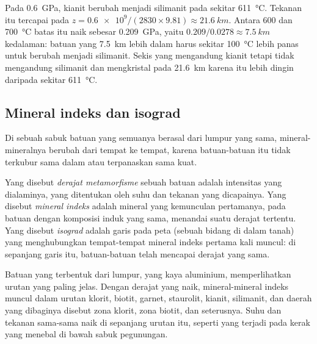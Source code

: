 \begin{example}\label{ex:g12:metamorphic-rocks:kysil}
Pada \qty{0.6}{GPa}, kianit berubah menjadi silimanit pada sekitar
\qty{611}{\celsius}. Tekanan itu tercapai pada $z = \num{0.6e9} / (2830
\times 9.81) \approx \qty{21.6}{km}$. Antara 600 dan \qty{700}{\celsius}
batas itu naik sebesar \qty{0.209}{GPa}, yaitu $0.209/0.0278 \approx
\qty{7.5}{km}$ kedalaman: batuan yang \qty{7.5}{km} lebih dalam harus sekitar
\qty{100}{\celsius} lebih panas untuk berubah menjadi silimanit. Sekis yang
mengandung kianit tetapi tidak mengandung silimanit dan mengkristal pada
\qty{21.6}{km} karena itu lebih dingin daripada sekitar \qty{611}{\celsius}.
\end{example}

\subsection{Mineral indeks dan isograd}

Di sebuah sabuk batuan yang semuanya berasal dari lumpur yang sama,
mineral-mineralnya berubah dari tempat ke tempat, karena batuan-batuan itu
tidak terkubur sama dalam atau terpanaskan sama kuat.

\begin{definition}\label{def:g12:metamorphic-rocks:index-mineral}
Yang disebut \emph{derajat metamorfisme} sebuah
batuan adalah intensitas  yang dialaminya, yang ditentukan oleh
suhu dan tekanan yang dicapainya. Yang disebut \emph{mineral
indeks} adalah mineral yang kemunculan pertamanya, pada
batuan dengan komposisi induk yang sama, menandai suatu derajat tertentu. Yang
disebut \emph{isograd} adalah garis pada peta (sebuah bidang di
dalam tanah) yang menghubungkan tempat-tempat mineral indeks pertama kali
muncul: di sepanjang garis itu, batuan-batuan telah mencapai derajat yang sama.
\end{definition}

Batuan yang terbentuk dari lumpur, yang kaya aluminium, memperlihatkan urutan
yang paling jelas. Dengan derajat yang naik, mineral-mineral indeks muncul
dalam urutan klorit, biotit, garnet, staurolit, kianit, silimanit, dan daerah
yang dibaginya disebut zona klorit, zona biotit, dan seterusnya. Suhu dan
tekanan sama-sama naik di sepanjang urutan itu, seperti yang terjadi pada kerak
yang menebal di bawah sabuk pegunungan.

